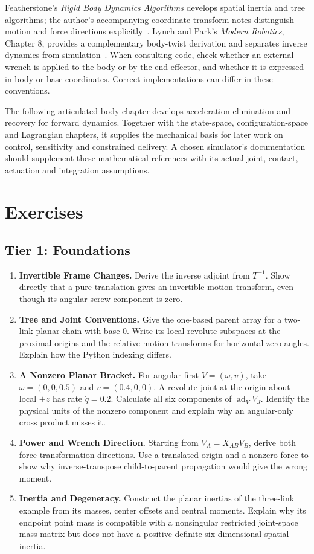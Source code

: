 Featherstone's \textit{Rigid Body Dynamics Algorithms} develops spatial inertia and tree algorithms; the author's accompanying coordinate-transform notes distinguish motion and force directions explicitly~\cite{Featherstone2008,FeatherstoneSpatialReview}. Lynch and Park's \textit{Modern Robotics}, Chapter 8, provides a complementary body-twist derivation and separates inverse dynamics from simulation~\cite{Lynch2017}. When consulting code, check whether an external wrench is applied to the body or by the end effector, and whether it is expressed in body or base coordinates. Correct implementations can differ in these conventions.

The following articulated-body chapter develops acceleration elimination and recovery for forward dynamics. Together with the state-space, configuration-space and Lagrangian chapters, it supplies the mechanical basis for later work on control, sensitivity and constrained delivery. A chosen simulator's documentation should supplement these mathematical references with its actual joint, contact, actuation and integration assumptions.

\section{Exercises}

\subsection{Tier 1: Foundations}
\begin{enumerate}[itemsep=3pt,topsep=4pt]
\item \textbf{Invertible Frame Changes.} Derive the inverse adjoint from $T^{-1}$. Show directly that a pure translation gives an invertible motion transform, even though its angular screw component is zero.
\item \textbf{Tree and Joint Conventions.} Give the one-based parent array for a two-link planar chain with base 0. Write its local revolute subspaces at the proximal origins and the relative motion transforms for horizontal-zero angles. Explain how the Python indexing differs.
\item \textbf{A Nonzero Planar Bracket.} For angular-first $V=(\omega,v)$, take $\omega=(0,0,0.5)$ and $v=(0.4,0,0)$. A revolute joint at the origin about local $+z$ has rate $\dot q=0.2$. Calculate all six components of $\operatorname{ad}_VV_J$. Identify the physical units of the nonzero component and explain why an angular-only cross product misses it.
\item \textbf{Power and Wrench Direction.} Starting from $V_A=X_{AB}V_B$, derive both force transformation directions. Use a translated origin and a nonzero force to show why inverse-transpose child-to-parent propagation would give the wrong moment.
\item \textbf{Inertia and Degeneracy.} Construct the planar inertias of the three-link example from its masses, center offsets and central moments. Explain why its endpoint point mass is compatible with a nonsingular restricted joint-space mass matrix but does not have a positive-definite six-dimensional spatial inertia.
\end{enumerate}

